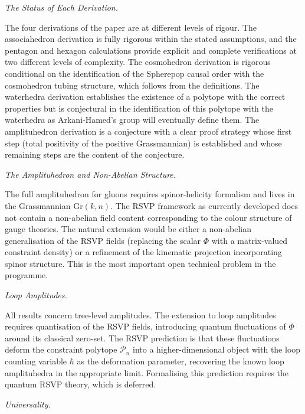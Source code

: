\documentclass[11pt]{article}
\theoremstyle{plain}
\theoremstyle{definition}
\theoremstyle{remark}
\newcommand{\Gr}{\mathrm{Gr}}
\newcommand{\Phif}{\Phi}
\begin{document}
\medskip\noindent\textit{The Status of Each Derivation.}

The four derivations of the paper are at different levels of rigour. The associahedron derivation is fully rigorous within the stated assumptions, and the pentagon and hexagon calculations provide explicit and complete verifications at two different levels of complexity. The cosmohedron derivation is rigorous conditional on the identification of the Spherepop causal order with the cosmohedron tubing structure, which follows from the definitions. The waterhedra derivation establishes the existence of a polytope with the correct properties but is conjectural in the identification of this polytope with the waterhedra as Arkani-Hamed's group will eventually define them. The amplituhedron derivation is a conjecture with a clear proof strategy whose first step (total positivity of the positive Grassmannian) is established and whose remaining steps are the content of the conjecture.

\medskip\noindent\textit{The Amplituhedron and Non-Abelian Structure.}

The full amplituhedron for gluons requires spinor-helicity formalism and lives in the Grassmannian $\Gr(k,n)$. The RSVP framework as currently developed does not contain a non-abelian field content corresponding to the colour structure of gauge theories. The natural extension would be either a non-abelian generalisation of the RSVP fields (replacing the scalar $\Phif$ with a matrix-valued constraint density) or a refinement of the kinematic projection incorporating spinor structure. This is the most important open technical problem in the programme.

\medskip\noindent\textit{Loop Amplitudes.}

All results concern tree-level amplitudes. The extension to loop amplitudes requires quantisation of the RSVP fields, introducing quantum fluctuations of $\Phif$ around its classical zero-set. The RSVP prediction is that these fluctuations deform the constraint polytope $\mathcal{P}_n$ into a higher-dimensional object with the loop counting variable $\hbar$ as the deformation parameter, recovering the known loop amplituhedra in the appropriate limit. Formalising this prediction requires the quantum RSVP theory, which is deferred.

\medskip\noindent\textit{Universality.}
\end{document}
